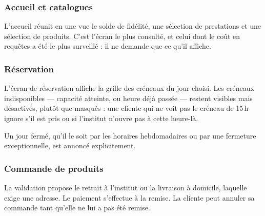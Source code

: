 \subsubsection{Accueil et catalogues}


L'accueil réunit en une vue le solde de fidélité, une sélection de prestations
et une sélection de produits. C'est l'écran le plus consulté, et celui dont le
coût en requêtes a été le plus surveillé : il ne demande que ce qu'il affiche.


\subsubsection{Réservation}


L'écran de réservation affiche la grille des créneaux du jour choisi. Les
créneaux indisponibles --- capacité atteinte, ou heure déjà passée --- restent
visibles mais désactivés, plutôt que masqués : une cliente qui ne voit pas le
créneau de 15\,h ignore s'il est pris ou si l'institut n'ouvre pas à cette
heure-là.

Un jour fermé, qu'il le soit par les horaires hebdomadaires ou par une
fermeture exceptionnelle, est annoncé explicitement.


\subsubsection{Commande de produits}



La validation propose le retrait à l'institut ou la livraison à domicile,
laquelle exige une adresse. Le paiement s'effectue à la remise. La cliente peut
annuler sa commande tant qu'elle ne lui a pas été remise.

